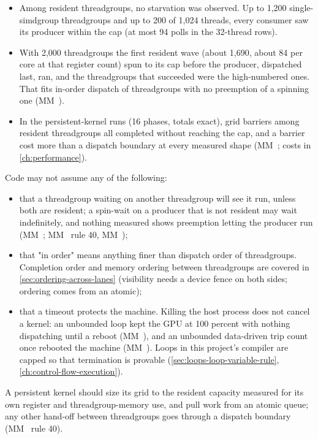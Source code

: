 \begin{itemize}
\item Among resident threadgroups, no starvation was observed. Up to 1,200 single-simdgroup threadgroups and up to 200
  of 1,024 threads, every consumer saw its producer within the cap (at most 94 polls in the 32-thread rows).
\item With 2,000 threadgroups the first resident wave (about 1,690, about 84 per core at
  that register count) spun to its cap before the producer, dispatched last, ran, and the threadgroups that
  succeeded were the high-numbered ones. That fits in-order dispatch of threadgroups with no preemption of a
  spinning one (MM~).
\item In the persistent-kernel runs (16 phases, totals exact), grid barriers among resident threadgroups all completed
  without reaching the cap, and a barrier cost more than a dispatch boundary at every measured shape (MM~;
  costs in \cref{ch:performance}).
\end{itemize}

Code may not assume any of the following:

\begin{itemize}
\item that a threadgroup waiting on another threadgroup will see it run, unless both are resident; a spin-wait on a
  producer that is not resident may wait indefinitely, and nothing measured shows preemption letting the producer run
  (MM~; MM~ rule 40, MM~);
\item that "in order" means anything finer than dispatch order of threadgroups. Completion order and memory ordering between threadgroups
  are covered in \cref{sec:ordering-across-lanes} (visibility needs a device fence on both
  sides; ordering comes from an atomic);
\item that a timeout protects the machine. Killing the host process does not cancel a kernel: an unbounded loop kept the GPU
  at 100 percent with nothing dispatching until a reboot (MM~), and an unbounded data-driven trip count once
  rebooted the machine (MM~). Loops in this project's compiler are capped so that termination is provable
  (\cref{sec:loops-loop-variable-rule}, \cref{ch:control-flow-execution}).
\end{itemize}

A persistent kernel should size its grid to the resident capacity measured for its own register and
threadgroup-memory use, and pull work from an atomic queue; any other hand-off between
threadgroups goes through a dispatch boundary (MM~ rule 40).

